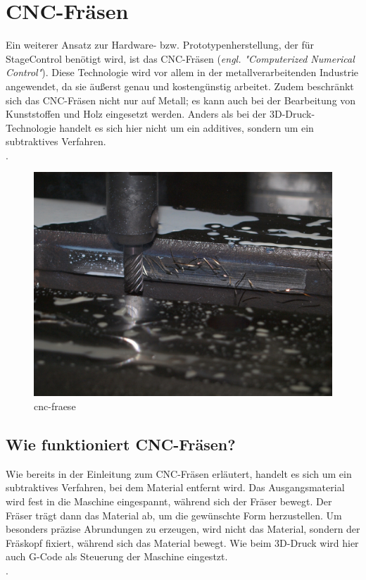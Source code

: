 \section{CNC-Fräsen}

Ein weiterer Ansatz zur Hardware- bzw. Prototypenherstellung, der für StageControl benötigt wird, ist das CNC-Fräsen (\emph{engl. "Computerized Numerical Control"}). Diese Technologie wird vor allem in der metallverarbeitenden Industrie angewendet, da sie äußerst genau und kostengünstig arbeitet. Zudem beschränkt sich das CNC-Fräsen nicht nur auf Metall; es kann auch bei der Bearbeitung von Kunststoffen und Holz eingesetzt werden. Anders als bei der 3D-Druck-Technologie handelt es sich hier nicht um ein additives, sondern um ein subtraktives Verfahren.\\
 \cite{CNC-Fraesen} \cite{CNC-Fraesen_2} \cite{CNC-Fraesen_3}.


\begin{figure}[H]
	\centering
	\includegraphics[width=0.8\linewidth]{images/CNC.jpg}
	\caption[cnc-fraese]{cnc-fraese}
	\label{fig:cnc-fraese}
\end{figure}

\subsection{Wie funktioniert CNC-Fräsen?}
Wie bereits in der Einleitung zum CNC-Fräsen erläutert, handelt es sich um ein subtraktives Verfahren, bei dem Material entfernt wird. Das Ausgangsmaterial wird fest in die Maschine eingespannt, während sich der Fräser bewegt. Der Fräser trägt dann das Material ab, um die gewünschte Form herzustellen. Um besonders präzise Abrundungen zu erzeugen, wird nicht das Material, sondern der Fräskopf fixiert, während sich das Material bewegt. Wie beim 3D-Druck wird hier auch G-Code als Steuerung der Maschine eingestzt. \\
\cite{CNC-Fraesen_2} \cite{CNC-Fraesen_3}.


